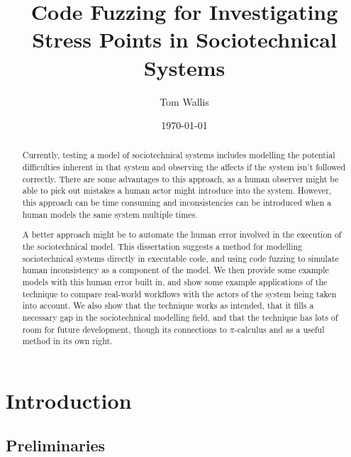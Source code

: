 \documentclass[a4paper]{l4proj}
\begin{document}
\title{Code Fuzzing for Investigating Stress Points in Sociotechnical Systems}  %
\author{Tom Wallis}
\date{\today}
\maketitle

\begin{abstract}
\noindent Currently, testing a model of sociotechnical systems includes modelling the potential difficulties inherent in that system and observing the affects if the system isn't followed correctly. There are some advantages to this approach, as a human observer might be able to pick out mistakes a human actor might introduce into the system. However, this approach can be time consuming and inconsistencies can be introduced when a human models the same system multiple times. \par
A better approach might be to automate the human error involved in the execution of the sociotechnical model. This dissertation suggests a method for modelling sociotechnical systems directly in executable code, and using code fuzzing to simulate human inconsistency as a component of the model. We then provide some example models with this human error built in, and show some example applications of the technique to compare real-world workflows with the actors of the system being taken into account. We also show that the technique works as intended, that it fills a necessary gap in the sociotechnical modelling field, and that the technique has lots of room for future development, though its connections to \(\pi\)-calculus and as a useful method in its own right. \par

\end{abstract}

\educationalconsent
\tableofcontents

\chapter{Introduction}
\label{intro}

\section{Preliminaries}
\label{preliminaries}
\end{document}
